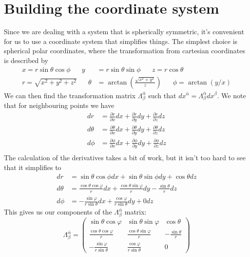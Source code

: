 \documentclass[11pt]{article}
\numberwithin{equation}{section}
\numberwithin{figure}{section}
\numberwithin{table}{section}
\begin{document}
\section{Building the coordinate system}\label{sec:coordinates}
\par Since we are dealing with a system that is spherically symmetric, it's convenient for us to use a coordinate system that simplifies things. The simplest choice is spherical polar coordinates, where the transformation from cartesian coordinates is described by 
\begin{align}
    x=r\sin\theta\cos\phi\hspace{20pt}y&=r\sin\theta\sin\phi\hspace{20pt}z=r\cos\theta
    \label{eqn:cartesian to spherical polars}\\
    r=\sqrt{x^2+y^2+z^2}\hspace{20pt}\theta&=\arctan(\frac{\sqrt{x^2+y^2}}{z})\hspace{20pt}\phi=\arctan(y/x)
    \label{eqn:spherical polars to cartesian}
\end{align}
We can then find the transformation matrix $\Lambda_\beta^{\bar\alpha}$ such that $dx^{\bar\alpha}=\Lambda^{\bar\alpha}_\beta dx^\beta$. We note that for neighbouring points we have 
\begin{align*}
    dr&=\frac{\partial r}{\partial x}dx + \frac{\partial r}{\partial y}dy + \frac{\partial r}{\partial z}dz\\
    d\theta&=\frac{\partial \theta}{\partial x}dx + \frac{\partial \theta}{\partial y}dy + \frac{\partial \theta}{\partial z}dz\\
    d\phi&=\frac{\partial \phi}{\partial x}dx + \frac{\partial \phi}{\partial y}dy + \frac{\partial \phi}{\partial z}dz\\
\end{align*}
The calculation of the derivatives takes a bit of work, but it isn't too hard to see that it simplifies to 
\begin{align*}
    dr&=\sin\theta\cos\phi dx + \sin\theta\sin\phi dy + \cos\theta dz\\
    d\theta&=\frac{\cos\theta\cos\varphi}{r}dx + \frac{\cos\theta\sin\varphi}{r} dy -\frac{\sin\theta}{r}dz\\
    d\phi&=-\frac{\sin\varphi}{r\sin\theta}dx + \frac{\cos\varphi}{r\sin\theta}dy + 0dz
\end{align*}
This gives us our components of the $\Lambda_\beta^{\bar\alpha}$ matrix:
\begin{equation}
    \Lambda_\beta^{\bar\alpha}=
    \begin{pmatrix}
        \sin\theta\cos\varphi&\sin\theta\sin\varphi&\cos\theta\\
        \frac{\cos\theta\cos\varphi}{r}&\frac{\cos\theta\sin\varphi}{r}&-\frac{\sin\theta}{r}\\
        -\frac{\sin\varphi}{r\sin\theta}&\frac{\cos\varphi}{r\sin\theta}&0
    \end{pmatrix}
\end{equation}
\end{document}
